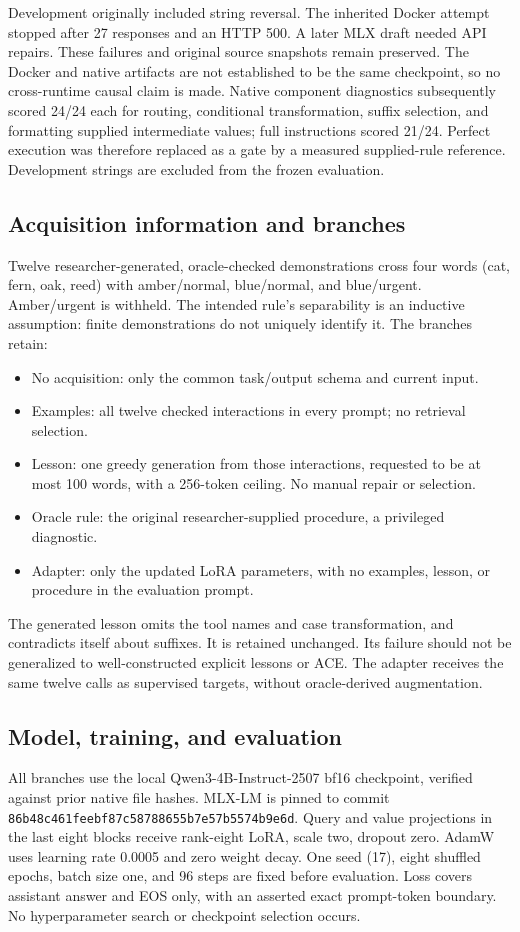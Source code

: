 \documentclass[11pt]{article}
\begin{document}
Development originally included string reversal. The inherited Docker attempt stopped after 27 responses and an HTTP 500. A later MLX draft needed API repairs. These failures and original source snapshots remain preserved. The Docker and native artifacts are not established to be the same checkpoint, so no cross-runtime causal claim is made. Native component diagnostics subsequently scored 24/24 each for routing, conditional transformation, suffix selection, and formatting supplied intermediate values; full instructions scored 21/24. Perfect execution was therefore replaced as a gate by a measured supplied-rule reference. Development strings are excluded from the frozen evaluation.

\subsection{Acquisition information and branches}
Twelve researcher-generated, oracle-checked demonstrations cross four words (cat, fern, oak, reed) with amber/normal, blue/normal, and blue/urgent. Amber/urgent is withheld. The intended rule's separability is an inductive assumption: finite demonstrations do not uniquely identify it. The branches retain:
\begin{itemize}
\item No acquisition: only the common task/output schema and current input.
\item Examples: all twelve checked interactions in every prompt; no retrieval selection.
\item Lesson: one greedy generation from those interactions, requested to be at most 100 words, with a 256-token ceiling. No manual repair or selection.
\item Oracle rule: the original researcher-supplied procedure, a privileged diagnostic.
\item Adapter: only the updated LoRA parameters, with no examples, lesson, or procedure in the evaluation prompt.
\end{itemize}
The generated lesson omits the tool names and case transformation, and contradicts itself about suffixes. It is retained unchanged. Its failure should not be generalized to well-constructed explicit lessons or ACE. The adapter receives the same twelve calls as supervised targets, without oracle-derived augmentation.

\subsection{Model, training, and evaluation}
All branches use the local Qwen3-4B-Instruct-2507 bf16 checkpoint, verified against prior native file hashes. MLX-LM is pinned to commit \texttt{86b48c461feebf87c58788655b7e57b5574b9e6d}. Query and value projections in the last eight blocks receive rank-eight LoRA, scale two, dropout zero. AdamW uses learning rate 0.0005 and zero weight decay. One seed (17), eight shuffled epochs, batch size one, and 96 steps are fixed before evaluation. Loss covers assistant answer and EOS only, with an asserted exact prompt-token boundary. No hyperparameter search or checkpoint selection occurs.
\end{document}
